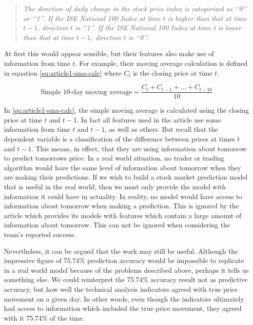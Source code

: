 \documentclass{report}
\begin{document}
\begin{quotation}
\textit{The direction of daily change in the stock price index is categorized
as ‘‘0’’ or ‘‘1’’. If the ISE National 100 Index at time $t$ is higher
than that at time $t-1$, direction $t$ is ‘‘1’’. If the ISE National 100
Index at time t is lower than that at time $t-1$, direction $t$ is ‘‘0’’.}
\end{quotation}

At first this would appear sensible, but their features also make use of information from time $t$. For example, their moving average calculation is defined in equation \ref{eq:article1-sma-calc} where $C_{t}$ is the closing price at time $t$.

  \begin{figure}[H]
  \begin{center}
      \begin{equation}
        \text{Simple 10-day moving average} = \dfrac
          {C_{t} + C_{t-1} + ... + C_{t-10}} {10}
        \label{eq:article1-sma-calc}
      \end{equation}
  \end{center}
  \end{figure} 

In \ref{eq:article1-sma-calc}, the simple moving average is calculated using the closing price at time $t$ and $t-1$. In fact all features used in the article use some information from time $t$ and $t-1$, as well as others. But recall that the dependent variable is a classification of the difference between prices at times $t$ and $t-1$. This means, in effect, that they are using information about tomorrow to predict tomorrows price. In a real world situation, no trader or trading algorithm would have the same level of information about tomorrow when they are making their predictions. If we wish to build a stock market prediction model that is useful in the real world, then we must only provide the model with information it could have in actuality. In reality, no model would have access to information about tomorrow when making a prediction. This is ignored by the article which provides its models with features which contain a large amount of information about tomorrow. This can not be ignored when considering the team's reported success.

Nevertheless, it can be argued that the work may still be useful. Although the impressive figure of 75.74\% prediction accuracy would be impossible to replicate in a real world model because of the problems described above, perhaps it tells us something else. We could reinterpret the 75.74\% accuracy result not as predictive accuracy, but how well the technical analysis indicators agreed with true price movement on a given day. In other words, even though the indicators ultimately had access to information which included the true price movement, they agreed with it 75.74\% of the time. 
\end{document}
